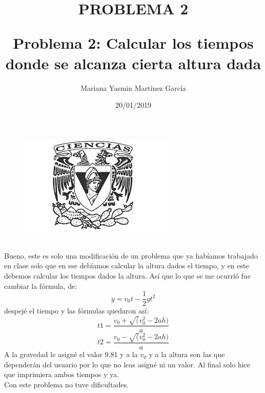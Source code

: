 \documentclass{article}
\title{\Huge\item\color{orange}\textbf{PROBLEMA 2 }}
\author{\Large Mariana Yasmin Martínez García}
\date{\Large 20/01/2019}
\begin{document}
\begin{figure}[t]
	\centering
	\includegraphics[width=0.7\linewidth]{../Imagenes/1}
	\caption{}
	\label{figura:1}
\end{figure}



	\maketitle
		
	\newpage
	
	\title{\huge\textbf{Problema 2: Calcular los tiempos donde se alcanza cierta altura dada }} \\
	Bueno, este es solo una modificación de un problema que ya habíamos trabajado en clase solo que en ese debíamos calcular la altura dados el tiempo, y en este debemos calcular los tiempos dados la altura. Así que lo que se me ocurrió fue cambiar la fórmula, de: 	\[ y ={v_{0}} t - \frac{1}{2}g t^{2}  \] despejé el tiempo y las fórmulas quedaron así:
	\[ t1 = \frac{v_{0} + \sqrt(v_{0}^2 - 2ah)}{a} \]
	\[ t2 = \frac{v_{0} - \sqrt(v_{0}^2 - 2ah)}{a} \]
	A la gravedad le asigné el valor 9.81 y a la $v_0$ y a la altura son las que dependerán del usuario por lo que no leas asigné ni un valor. Al final solo hice que imprimiera ambos tiempos y ya. \\
	Con este problema no tuve dificultades.
\end{document}
